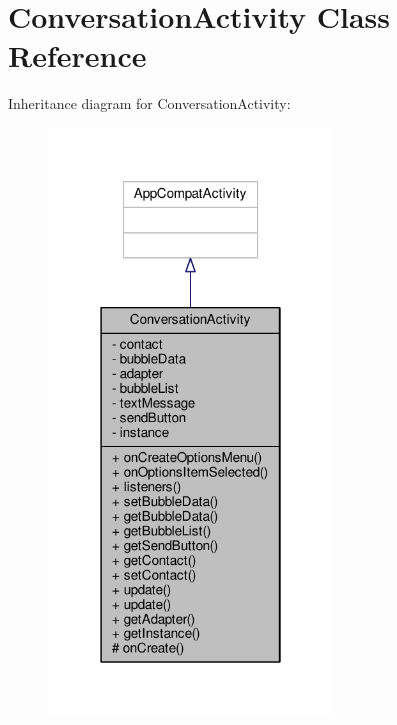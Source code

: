 \hypertarget{a00007}{\section{Conversation\+Activity Class Reference}
\label{a00007}
}


Inheritance diagram for Conversation\+Activity\+:
\nopagebreak
\begin{figure}[H]
\begin{center}
\leavevmode
\includegraphics[width=214pt]{a00074}
\end{center}
\end{figure}


